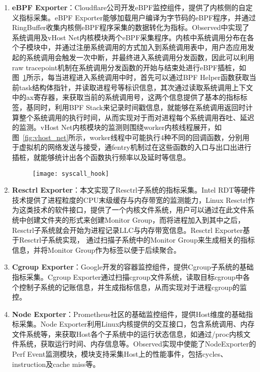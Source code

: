 \begin{enumerate}
    \item \textbf{eBPF Exporter}：Cloudflare公司开发eBPF监控组件，提供了内核侧的自定义指标采集。eBPF Exporter能够加载用户编译为字节码的eBPF程序，并通过RingBuffer收集内核侧eBPF程序采集的数据转化为指标。Observed中实现了系统调用及vHost Net内核模块两个eBPF采集程序。内核中系统调用分布在各个子模块中，并通过注册系统调用的方式加入到系统调用表中，用户态应用发起的系统调用会触发一次中断，并最终进入系统调用分发函数，因此可以利用raw tracepoint机制在系统调用分发函数的开始与结束处进行eBPF插桩，如图~\ref{fig:syscall_hook}所示，每当进程进入系统调用中时，首先可以通过BPF Helper函数获取当前task结构体指针，并读取进程号等标识信息，其次通过读取系统调用上下文中的ax寄存器，来获取当前的系统调用号，这两个信息提供了基本的指标标签，基同时，利用BPF Stack来记录时间戳信息，就能够在系统调用返回时计算整个系统调用的执行时间，从而实现对于而对进程每个系统调用吞吐、延迟的监测。vHost Net内核模块的监测则围绕worker内核线程展开，如图~\ref{fig:vhost_net}所示，worker线程中可能执行4种不同的回调函数，分别用于虚拟机的网络发送与接受，通fentry机制过在这些函数的入口与出口出进行插桩，就能够统计出各个函数执行频率以及延时等信息。

    \begin{figure}[H]
        \centering
        \texttt{[image: syscall\_hook]}
        \label{fig:syscall_hook}
    \end{figure}

    \item \textbf{Resctrl Exporter}：本文实现了Resctrl子系统的指标采集。Intel RDT等硬件技术提供了进程粒度的CPU末级缓存与内存带宽的监测能力，Linux Resctrl作为这类技术的软件接口，提供了一个内核文件系统，用户可以通过在此文件系统中创建文件夹的形式来创建Monitor Group，而将进程加入到其中之后，Resctrl子系统就会开始为进程记录LLC与内存带宽信息。Resctrl Exporter基于Resctrl子系统实现， 通过扫描子系统中的Monitor Group来生成相关的指标信息，并将Monitor Group作为标签以便于后续聚合。
    
    \item \textbf{Cgroup Exporter}：Google开发的容器监控组件，提供Cgroup子系统的基础指标采集。Cgroup Exporter通过扫描cgroup文件系统，读取目标cgroup中各个控制子系统的记账信息，并生成指标信息，从而实现对于进程cgroup的监控。
    
    \item \textbf{Node Exporter}：Prometheus社区的基础监控组件，提供Host维度的基础指标采集。Node Exporter利用Linux内核提供的交互接口，包含系统调用、内存文件系统等，来获取Host各个子系统中的运行状态信息，如通过/proc内核文件系统，获取运行时间、内存信息等。Observed实现中使能了NodeExporter的Perf Event监测模块，模块支持采集Host上的性能事件，包括cycles、instruction及cache miss等。

\end{enumerate}

